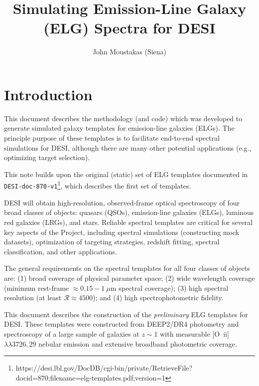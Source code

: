 \documentclass[12pt]{article}
\newcommand{\oiilam}{[O~{\sc ii}]~\ensuremath{\lambda\lambda3726,29}}
\begin{document}
\title{
  Simulating Emission-Line Galaxy (ELG) Spectra for DESI 
}

\author{John Moustakas (Siena)}
\maketitle


\section{Introduction}

This document describes the methodology (and code) which was developed
to generate simulated galaxy templates for emission-line galaxies
(ELGs).  The principle purpose of these templates is to facilitate
end-to-end spectral simulations for DESI, although there are many
other potential applications (e.g., optimizing target selection).

This note builds upon the original (static) set of ELG templates
documented in {\tt
  DESI-doc-870-v1}\footnote{https://desi.lbl.gov/DocDB/cgi-bin/private/RetrieveFile?docid=870;filename=elg-templates.pdf;version=1},
which describes the first set of templates.



DESI will obtain high-resolution, observed-frame optical spectroscopy
of four broad classes of objects: quasars (QSOs), emission-line
galaxies (ELGs), luminous red galaxies (LRGs), and stars.  Reliable
spectral templates are critical for several key aspects of the
Project, including spectral simulations (constructing mock datasets),
optimization of targeting strategies, redshift fitting, spectral
classification, and other applications.

The general requirements on the spectral templates for all four
classes of objects are: (1) broad coverage of physical parameter
space; (2) wide wavelength coverage (minimum rest-frame
$\approx0.15-1~\mu$m spectral coverage); (3) high spectral
resolution (at least $\mathcal{R}\approx4500$); and (4) high
spectrophotometric fidelity.  

This document describes the construction of the \emph{preliminary} ELG
templates for DESI.  These templates were constructed from DEEP2/DR4
photometry and spectroscopy of a large sample of galaxies at $z\sim1$
with measurable \oiilam{} nebular emission and extensive broadband
photometric coverage.
\end{document}
